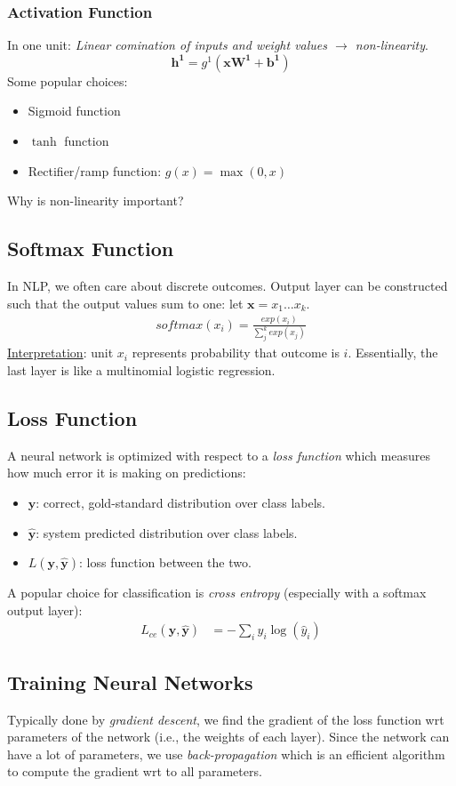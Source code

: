 \documentclass{article}
\begin{document}
\subsubsection{Activation Function}
In one unit: \textit{Linear comination of inputs and weight values $\rightarrow$ non-linearity}.
\[\mathbf{h^1} = g^1(\mathbf{xW^1} + \mathbf{b^1})\]
Some popular choices:
\begin{itemize}
    \item Sigmoid function
    \item $\tanh$ function
    \item Rectifier/ramp function: $g(x) = \max(0,x)$
\end{itemize}
Why is non-linearity important?
\subsection{Softmax Function}
In NLP, we often care about discrete outcomes. Output layer can be constructed such that the output values sum to one: let $\mathbf{x} = x_1\ldots x_k$.
\begin{align}
    softmax(x_i) = \frac{exp(x_i)}{\sum_j^k exp(x_j)}
\end{align}
\underline{Interpretation}: unit $x_i$ represents probability that outcome is $i$. Essentially, the last layer is like a multinomial logistic regression.
\subsection{Loss Function}
A neural network is optimized with respect to a \textit{loss function} which measures how much error it is making on predictions:
\begin{itemize}
    \item $\mathbf{y}$: correct, gold-standard distribution over class labels.
    \item $\mathbf{\hat{y}}$: system predicted distribution over class labels.
    \item $L(\mathbf{y},\mathbf{\hat{y}})$: loss function between the two.
\end{itemize}
A popular choice for classification is \textit{cross entropy} (especially with a softmax output layer):
\begin{align}
    L_{ce}(\mathbf{y},\mathbf{\hat{y}}) &= -\sum_i y_i\log(\hat{y}_i)
\end{align}
\subsection{Training Neural Networks}
Typically done by \textit{gradient descent}, we find the gradient of the loss function wrt parameters of the network (i.e., the weights of each layer). Since the network can have a lot of parameters, we use \textit{back-propagation} which is an efficient algorithm to compute the gradient wrt to all parameters. 
\end{document}
